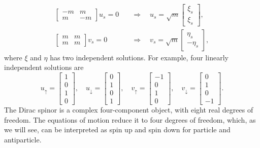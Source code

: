 \begin{equation}
\begin{aligned}
	\left[\begin{array}{cc}
		-m & m \\
		m & -m
	\end{array}\right] u_s = 0 
	\quad &\Longrightarrow \quad
	u_s = \sqrt{m}\left[\begin{array}{c}
		\xi_s \\ \xi_s
	\end{array}\right], \\
	\left[\begin{array}{cc}
		m & m \\
		m & m
	\end{array}\right] v_s = 0 
	\quad &\Longrightarrow \quad
	v_s = \sqrt{m}\left[\begin{array}{c}
		\eta_s \\ -\eta_s
	\end{array}\right],
\end{aligned}
\end{equation}
where $\xi$ and $\eta$ has two independent solutions.
For example, four linearly independent solutions are
\begin{equation}
	u_{\uparrow} = \left[\begin{array}{c} 1 \\ 0 \\ 1 \\ 0 \end{array}\right], \quad
	u_{\downarrow} = \left[\begin{array}{c} 0 \\ 1 \\ 0 \\ 1 \end{array}\right], \quad
	v_{\uparrow} = \left[\begin{array}{c} -1 \\ 0 \\ 1 \\ 0 \end{array}\right], \quad
	v_{\downarrow} = \left[\begin{array}{c} 0 \\ 1 \\ 0 \\ -1 \end{array}\right].
\end{equation}
The Dirac spinor is a complex four-component object, with eight real degrees of freedom. 
The equations of motion reduce it to four degrees of freedom, which, as we will see, can be interpreted as spin up and spin down for particle and antiparticle.


